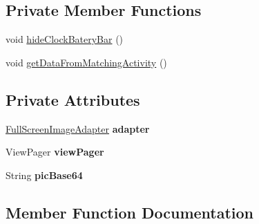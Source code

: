 \subsection*{Private Member Functions}
\begin{DoxyCompactItemize}
\item 
void \hyperlink{classcom_1_1example_1_1sebastian_1_1tindertp_1_1FullScreenViewActivity_a666951a13ab334846984245c0af2bc5d}{hide\+Clock\+Batery\+Bar} ()
\item 
void \hyperlink{classcom_1_1example_1_1sebastian_1_1tindertp_1_1FullScreenViewActivity_a0843ad0a4eb38e0597a3ca1a6b698f53}{get\+Data\+From\+Matching\+Activity} ()
\end{DoxyCompactItemize}
\subsection*{Private Attributes}
\begin{DoxyCompactItemize}
\item 
\hyperlink{classcom_1_1example_1_1sebastian_1_1tindertp_1_1animationTools_1_1FullScreenImageAdapter}{Full\+Screen\+Image\+Adapter} {\bfseries adapter}\hypertarget{classcom_1_1example_1_1sebastian_1_1tindertp_1_1FullScreenViewActivity_ae7992d6f86b15a17f89e1de86f702080}{}\label{classcom_1_1example_1_1sebastian_1_1tindertp_1_1FullScreenViewActivity_ae7992d6f86b15a17f89e1de86f702080}

\item 
View\+Pager {\bfseries view\+Pager}\hypertarget{classcom_1_1example_1_1sebastian_1_1tindertp_1_1FullScreenViewActivity_ab1e8b334abeec2dac68d75cae189a3c9}{}\label{classcom_1_1example_1_1sebastian_1_1tindertp_1_1FullScreenViewActivity_ab1e8b334abeec2dac68d75cae189a3c9}

\item 
String {\bfseries pic\+Base64}\hypertarget{classcom_1_1example_1_1sebastian_1_1tindertp_1_1FullScreenViewActivity_aa0062543ac550b0f05b31baced8dba91}{}\label{classcom_1_1example_1_1sebastian_1_1tindertp_1_1FullScreenViewActivity_aa0062543ac550b0f05b31baced8dba91}

\end{DoxyCompactItemize}


\subsection{Member Function Documentation}
